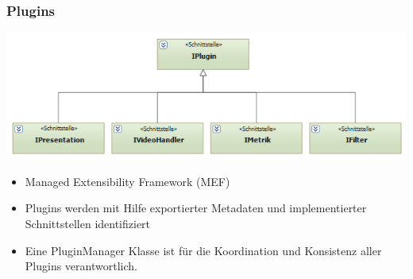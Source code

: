 \documentclass[t]{beamer}
\begin{document}
\begin{frame}
\frametitle{Plugins}
\includegraphics[scale=.5]{img/arch/IPluginStructure.png}
\newline
\newline
\begin{itemize}
\item <+-> Managed Extensibility Framework (MEF)
\item <+-> Plugins werden mit Hilfe exportierter Metadaten und
 implementierter Schnittstellen identifiziert
 \item <+-> Eine PluginManager Klasse ist für die Koordination und Konsistenz aller Plugins verantwortlich.
\end{itemize}
\end{frame}
\end{document}
